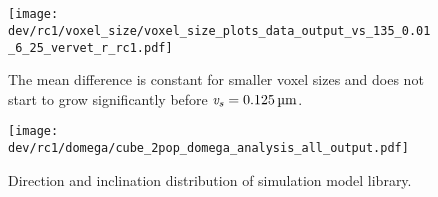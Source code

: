 \chapter{}
\label{app:Simulation}
%
%
\begin{sidewaysfigure}[!p]
\end{sidewaysfigure}
%
%
\begin{figure}[!p]
\centering
\texttt{[image: dev/rc1/voxel\_size/voxel\_size\_plots\_data\_output\_vs\_135\_0.01\_6\_25\_vervet\_r\_rc1.pdf]}
\caption[voxel size model with noise]{The mean difference is constant for smaller voxel sizes and does not start to grow significantly before $\voxels=\SI{0.125}{\micro\meter}$.}
\label{app:voxelsizeNoise}
\end{figure}
%
%
%
%
\begin{figure}[!t]
    \centering
    \texttt{[image: dev/rc1/domega/cube\_2pop\_domega\_analysis\_all\_output.pdf]}
    \caption{Direction and inclination distribution of simulation model library.}
\end{figure}
%
%
%
%
%
